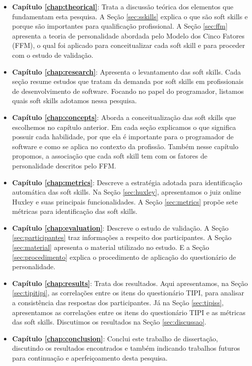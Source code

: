 \begin{itemize}

	\item \textbf{Capítulo \ref{chap:theorical}}: Trata a discussão teórica dos elementos que fundamentam esta pesquisa. A Seção \ref{sec:sskills} explica o que são soft skills e porque são importantes para qualificação profissional. A Seção \ref{sec:ffm} apresenta a teoria de personalidade abordada pelo Modelo dos Cinco Fatores (FFM), o qual foi aplicado para conceitualizar cada soft skill e para proceder com o estudo de validação.

	\item \textbf{Capítulo \ref{chap:research}}: Apresenta o levantamento das soft skills. Cada seção resume estudos que tratam da demanda por soft skills em profissionais de desenvolvimento de software. Focando no papel do programador, listamos quais soft skills adotamos nessa pesquisa.

	\item \textbf{Capítulo \ref{chap:concepts}}: Aborda a conceitualização das soft skills que escolhemos no capítulo anterior. Em cada seção explicamos o que significa possuir cada habilidade, por que ela é importante para o programador de software e como se aplica no contexto da profissão. Também nesse capítulo propomos, a associação que cada soft skill tem com os fatores de personalidade descritos pelo FFM.

	\item \textbf{Capítulo \ref{chap:metrics}}: Descreve a estratégia adotada para identificação automática das soft skills. Na Seção \ref{sec:huxley}, apresentamos o juiz online Huxley e suas principais funcionalidades. A Seção \ref{sec:metrics} propõe sete métricas para identificação das soft skills.

	\item \textbf{Capítulo \ref{chap:evaluation}}: Descreve o estudo de validação. A Seção \ref{sec:participantes} traz informações a respeito dos participantes. A Seção \ref{sec:material} apresenta o material utilizado no estudo. E a Seção \ref{sec:procedimento} explica o procedimento de aplicação do questionário de personalidade.

	\item \textbf{Capítulo \ref{chap:results}}: Trata dos resultados. Aqui apresentamos, na Seção \ref{sec:tipitipi}, as correlações entre os itens do questionário TIPI, para analisar a consistência das respostas dos participantes. Já na Seção \ref{sec:tipiss}, apresentamos as correlações entre os itens do questionário TIPI e as métricas das soft skills. Discutimos os resultados na Seção \ref{sec:discussao}.

	\item \textbf{Capítulo \ref{chap:conclusion}}: Conclui este trabalho de dissertação, discutindo os resultados encontrados e também indicando trabalhos futuros para continuação e aperfeiçoamento desta pesquisa.
	
\end{itemize}


